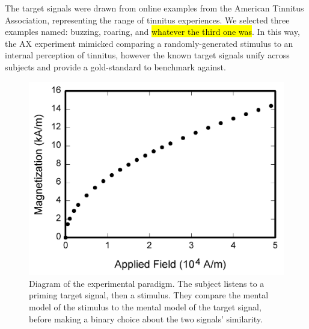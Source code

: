 \documentclass[journal]{IEEEtran}
\begin{document}
The target signals were drawn from online examples
from the American Tinnitus Association,
representing the range of tinnitus experiences.
We selected three examples named: buzzing, roaring, and \hl{whatever the third one was}.
In this way, the AX experiment mimicked
comparing a randomly-generated stimulus to an internal perception of tinnitus,
however the known target signals
unify across subjects and provide a gold-standard to benchmark against.

\begin{figure}[t]
	\centering
	\includegraphics[width=\linewidth]{fig1}
	\caption{Diagram of the experimental paradigm. The subject listens to a priming target signal,
  then a stimulus. They compare the mental model of the stimulus to the mental model of the target signal,
  before making a binary choice about the two signals' similarity.}
	\label{fig:experimentdiagram}
\end{figure}


\end{document}
